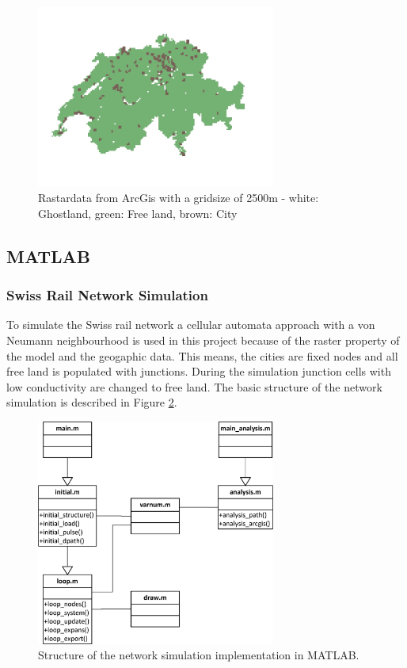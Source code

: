 \documentclass[11pt]{scrartcl}
\begin{document}
\begin{figure}[H]
	\centering
	\includegraphics[width=0.7\textwidth]{figures/map_2500_cities}
	\caption{Rastardata from ArcGis with a gridsize of 2500m - white: Ghostland, green: Free land, brown: City}
	\label{fig:map_cities}
\end{figure}


\subsection{MATLAB}

\subsubsection{Swiss Rail Network Simulation}

To simulate the Swiss rail network a cellular automata approach with a von Neumann neighbourhood is used in this project because of the raster property of the model and the geogaphic data. This means, the cities are fixed nodes and all free land is populated with junctions. During the simulation junction cells with low conductivity are changed to free land. The basic structure of the network simulation is described in Figure \ref{fig:structure}.

\begin{figure}[H]
	\centering
	\includegraphics[width=0.7\textwidth]{figures/source_code}
	\caption{Structure of the network simulation implementation in MATLAB.}
	\label{fig:structure}
\end{figure}
\end{document}
